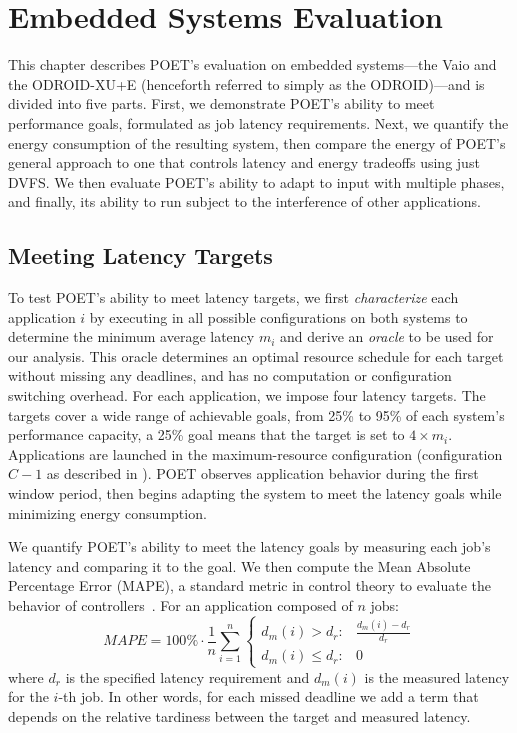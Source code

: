 \section{Embedded Systems Evaluation}
\label{sec:poet-embedded-evaluation}

This chapter describes POET's evaluation on embedded systems---the Vaio and the ODROID-XU+E (henceforth referred to simply as the ODROID)---and is divided into five parts.
First, we demonstrate POET's ability to meet performance goals, formulated as job latency requirements.
Next, we quantify the energy consumption of the resulting system, then compare the energy of POET's general approach to one that controls latency and energy tradeoffs using just DVFS.
We then evaluate POET's ability to adapt to input with multiple phases, and finally, its ability to run subject to the interference of other applications.


\subsection{Meeting Latency Targets}
\label{sec:poet-eval-embedded-performance}

To test POET's ability to meet latency targets, we first \emph{characterize} each application $i$ by executing in all possible configurations on both systems to determine the minimum average latency $m_i$ and derive an \emph{oracle} to be used for our analysis.
This oracle determines an optimal resource schedule for each target without missing any deadlines, and has no computation or configuration switching overhead.
For each application, we impose four latency targets.
The targets cover a wide range of achievable goals, from 25\% to 95\% of each system's performance capacity, \ie a 25\% goal means that the target is set to $4 \times m_i$.
Applications are launched in the maximum-resource configuration (configuration $C-1$ as described in ).
POET observes application behavior during the first window period, then begins adapting the system to meet the latency goals while minimizing energy consumption.

We quantify POET's ability to meet the latency goals by measuring each job's latency and comparing it to the goal.
We then compute the Mean Absolute Percentage Error (MAPE), a standard metric in control theory to evaluate the behavior of controllers~\cite{ICSE2014}.
For an application composed of $n$ jobs:
\begin{equation}
MAPE = 100\% \cdot \frac{1}{n} \sum\limits_{i=1}^{n} 
\left \{
\begin{array}{ll}
d_m(i) > d_{r}  :& \frac{d_m(i) - d_{r}}{d_r} \\
d_m(i) \le d_{r}  :& 0
\end{array} \right.
 \label{eqn:poet-mape}
\end{equation}
where $d_r$ is the specified latency requirement and $d_m(i)$ is the measured latency for the $i$-th job.
In other words, for each missed deadline we add a term that depends on the relative tardiness between the target and measured latency.

